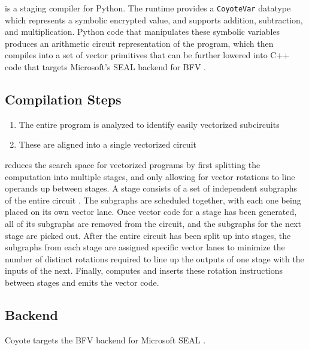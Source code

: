 \system is a staging compiler for Python.
The runtime provides a \texttt{CoyoteVar} datatype which represents a symbolic encrypted value, and supports addition, subtraction, and multiplication.
Python code that manipulates these symbolic variables produces an arithmetic circuit representation of the program, which \system then compiles into a set of vector primitives that can be further lowered into C++ code that targets Microsoft's SEAL backend for BFV .


 
\subsection*{Compilation Steps}
\begin{enumerate}
    \item The entire program is analyzed to identify easily vectorized subcircuits
    \item These are aligned into a single vectorized circuit
\end{enumerate}
\system reduces the search space for vectorized programs  by first splitting the computation into multiple stages, and only allowing for vector rotations to line operands up between stages.
A stage consists of a set of independent subgraphs of the entire circuit . 
The subgraphs are scheduled together, with each one being placed on its own vector lane. 
Once vector code for a stage has been generated, all of its subgraphs are removed from the circuit, and the subgraphs for the next stage are picked out.
After the entire circuit has been split up into stages, the subgraphs from each stage are assigned specific vector lanes to minimize the number of distinct rotations required to line up the outputs of one stage with the inputs of the next.
Finally, \system computes and inserts these rotation instructions between stages and emits the vector code.

\subsection{Backend}
Coyote targets the BFV backend for Microsoft SEAL .
